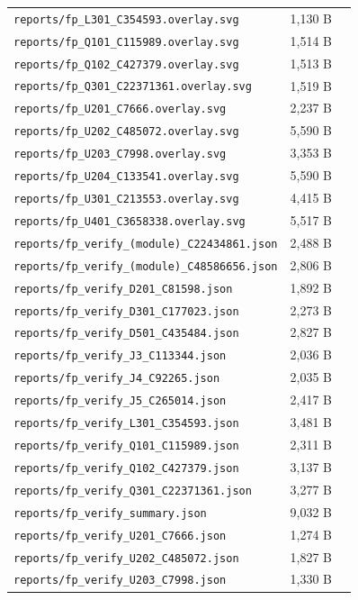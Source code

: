 \documentclass[11pt,a4paper]{article}
\begin{document}
{\begin{longtable}{p{9cm}rp{4cm}}
\texttt{reports/fp\_L301\_C354593.overlay.svg} & 1,130 B &  \\
\texttt{reports/fp\_Q101\_C115989.overlay.svg} & 1,514 B &  \\
\texttt{reports/fp\_Q102\_C427379.overlay.svg} & 1,513 B &  \\
\texttt{reports/fp\_Q301\_C22371361.overlay.svg} & 1,519 B &  \\
\texttt{reports/fp\_U201\_C7666.overlay.svg} & 2,237 B &  \\
\texttt{reports/fp\_U202\_C485072.overlay.svg} & 5,590 B &  \\
\texttt{reports/fp\_U203\_C7998.overlay.svg} & 3,353 B &  \\
\texttt{reports/fp\_U204\_C133541.overlay.svg} & 5,590 B &  \\
\texttt{reports/fp\_U301\_C213553.overlay.svg} & 4,415 B &  \\
\texttt{reports/fp\_U401\_C3658338.overlay.svg} & 5,517 B &  \\
\texttt{reports/fp\_verify\_(module)\_C22434861.json} & 2,488 B &  \\
\texttt{reports/fp\_verify\_(module)\_C48586656.json} & 2,806 B &  \\
\texttt{reports/fp\_verify\_D201\_C81598.json} & 1,892 B &  \\
\texttt{reports/fp\_verify\_D301\_C177023.json} & 2,273 B &  \\
\texttt{reports/fp\_verify\_D501\_C435484.json} & 2,827 B &  \\
\texttt{reports/fp\_verify\_J3\_C113344.json} & 2,036 B &  \\
\texttt{reports/fp\_verify\_J4\_C92265.json} & 2,035 B &  \\
\texttt{reports/fp\_verify\_J5\_C265014.json} & 2,417 B &  \\
\texttt{reports/fp\_verify\_L301\_C354593.json} & 3,481 B &  \\
\texttt{reports/fp\_verify\_Q101\_C115989.json} & 2,311 B &  \\
\texttt{reports/fp\_verify\_Q102\_C427379.json} & 3,137 B &  \\
\texttt{reports/fp\_verify\_Q301\_C22371361.json} & 3,277 B &  \\
\texttt{reports/fp\_verify\_summary.json} & 9,032 B &  \\
\texttt{reports/fp\_verify\_U201\_C7666.json} & 1,274 B &  \\
\texttt{reports/fp\_verify\_U202\_C485072.json} & 1,827 B &  \\
\texttt{reports/fp\_verify\_U203\_C7998.json} & 1,330 B &  \\

\end{longtable}}
\end{document}
